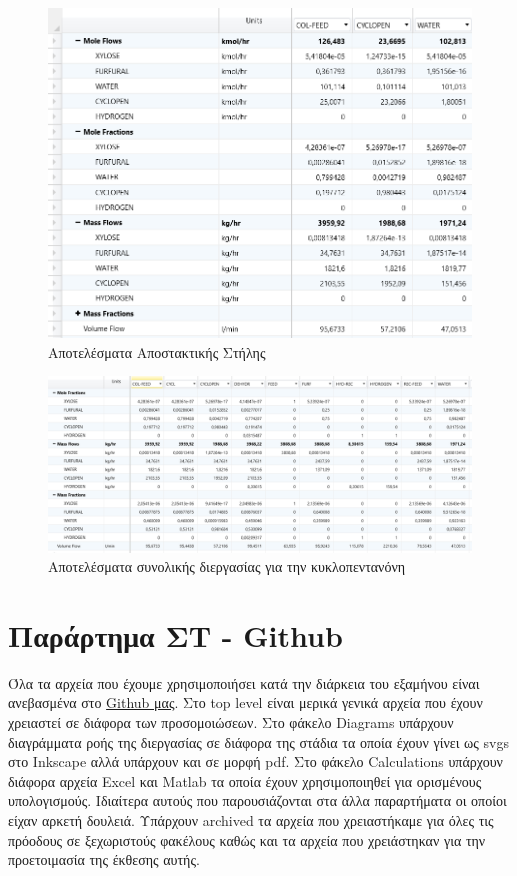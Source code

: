 \documentclass[11pt]{article}
\begin{document}
\begin{figure}[htbp]
\centering
\includegraphics[width=.9\linewidth]{Παράρτημα/2023-01-13_18-10-10_screenshot.png}
\caption{Αποτελέσματα Αποστακτικής Στήλης}
\end{figure}

\begin{figure}[htbp]
\centering
\includegraphics[width=.9\linewidth]{Παράρτημα/2023-01-13_18-10-19_screenshot.png}
\caption{Αποτελέσματα συνολικής διεργασίας για την κυκλοπεντανόνη}
\end{figure}

\pagebreak

\section{Παράρτημα ΣΤ - Github}
\label{sec:orgd9056cc}
Όλα τα αρχεία που έχουμε χρησιμοποιήσει κατά την διάρκεια του εξαμήνου είναι ανεβασμένα στο \href{https://github.com/Vidianos-Giannitsis/Process-Design}{Github μας}. Στο top level είναι μερικά γενικά αρχεία που έχουν χρειαστεί σε διάφορα των προσομοιώσεων. Στο φάκελο Diagrams υπάρχουν διαγράμματα ροής της διεργασίας σε διάφορα της στάδια τα οποία έχουν γίνει ως svgs στο Inkscape αλλά υπάρχουν και σε μορφή pdf. Στο φάκελο Calculations υπάρχουν διάφορα αρχεία Excel και Matlab τα οποία έχουν χρησιμοποιηθεί για ορισμένους υπολογισμούς. Ιδιαίτερα αυτούς που παρουσιάζονται στα άλλα παραρτήματα οι οποίοι είχαν αρκετή δουλειά. Υπάρχουν archived τα αρχεία που χρειαστήκαμε για όλες τις πρόοδους σε ξεχωριστούς φακέλους καθώς και τα αρχεία που χρειάστηκαν για την προετοιμασία της έκθεσης αυτής.
\end{document}
